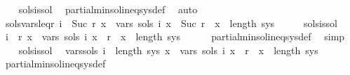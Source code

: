 \begin{isabellebody}
%
\isadelimproof
\ \ %
\endisadelimproof
%
\isatagproof
{}\isamarkupfalse%
\ sols{\isacharunderscore}{\kern0pt}is{\isacharunderscore}{\kern0pt}sol\ \isamarkupfalse%
\ partial{\isacharunderscore}{\kern0pt}min{\isacharunderscore}{\kern0pt}sol{\isacharunderscore}{\kern0pt}ineq{\isacharunderscore}{\kern0pt}sys{\isacharunderscore}{\kern0pt}def\ \isamarkupfalse%
\ auto%
\endisatagproof
{\isafoldproof}%
%
\isadelimproof
\isanewline
%
\endisadelimproof
\isanewline
{}\isamarkupfalse%
\ sols{\isacharprime}{\kern0pt}{\isacharunderscore}{\kern0pt}vars{\isacharunderscore}{\kern0pt}leq{\isacharunderscore}{\kern0pt}r{\isacharcolon}{\kern0pt}\ {\isachardoublequoteopen}{\isasymforall}i\ {\isacharless}{\kern0pt}\ Suc\ r{\isachardot}{\kern0pt}\ {\isasymforall}x\ {\isasymin}\ vars\ {\isacharparenleft}{\kern0pt}sols{\isacharprime}{\kern0pt}\ i{\isacharparenright}{\kern0pt}{\isachardot}{\kern0pt}\ x\ {\isasymge}\ Suc\ r\ {\isasymand}\ x\ {\isacharless}{\kern0pt}\ length\ sys{\isachardoublequoteclose}\isanewline
%
\isadelimproof
%
\endisadelimproof
%
\isatagproof
{}\isamarkupfalse%
\ {\isacharminus}{\kern0pt}\isanewline
\ \ \isamarkupfalse%
\ sols{\isacharunderscore}{\kern0pt}is{\isacharunderscore}{\kern0pt}sol\ \isamarkupfalse%
\ {\isachardoublequoteopen}{\isasymforall}i\ {\isacharless}{\kern0pt}\ r{\isachardot}{\kern0pt}\ {\isasymforall}x\ {\isasymin}\ vars\ {\isacharparenleft}{\kern0pt}sols\ i{\isacharparenright}{\kern0pt}{\isachardot}{\kern0pt}\ x\ {\isasymge}\ r\ {\isasymand}\ x\ {\isacharless}{\kern0pt}\ length\ sys{\isachardoublequoteclose}\isanewline
\ \ \ \ \isamarkupfalse%
\ partial{\isacharunderscore}{\kern0pt}min{\isacharunderscore}{\kern0pt}sol{\isacharunderscore}{\kern0pt}ineq{\isacharunderscore}{\kern0pt}sys{\isacharunderscore}{\kern0pt}def\ \isamarkupfalse%
\ simp\isanewline
\ \ \isamarkupfalse%
\ sols{\isacharunderscore}{\kern0pt}is{\isacharunderscore}{\kern0pt}sol\ \isamarkupfalse%
\ vars{\isacharunderscore}{\kern0pt}sols{\isacharcolon}{\kern0pt}\ {\isachardoublequoteopen}{\isasymforall}i\ {\isacharless}{\kern0pt}\ length\ sys{\isachardot}{\kern0pt}\ {\isasymforall}x\ {\isasymin}\ vars\ {\isacharparenleft}{\kern0pt}sols\ i{\isacharparenright}{\kern0pt}{\isachardot}{\kern0pt}\ x\ {\isasymge}\ r\ {\isasymand}\ x\ {\isacharless}{\kern0pt}\ length\ sys{\isachardoublequoteclose}\isanewline
\ \ \ \ \isamarkupfalse%
\ partial{\isacharunderscore}{\kern0pt}min{\isacharunderscore}{\kern0pt}sol{\isacharunderscore}{\kern0pt}ineq{\isacharunderscore}{\kern0pt}sys{\isacharunderscore}{\kern0pt}def\ \isamarkupfalse%

\end{isabellebody}
